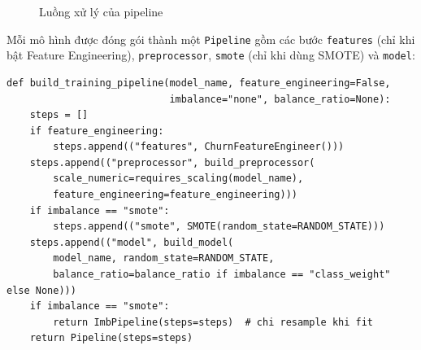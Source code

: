 \begin{figure}[H]
\centering
{}
\caption{Luồng xử lý của pipeline}
\end{figure}

Mỗi mô hình được đóng gói thành một \texttt{Pipeline} gồm các bước \texttt{features} (chỉ khi bật Feature Engineering), \texttt{preprocessor}, \texttt{smote} (chỉ khi dùng SMOTE) và \texttt{model}:

\begin{lstlisting}[style=pythonstyle, caption={Xây dựng pipeline huấn luyện trong \texttt{src/train.py} (rút gọn)}]
def build_training_pipeline(model_name, feature_engineering=False,
                            imbalance="none", balance_ratio=None):
    steps = []
    if feature_engineering:
        steps.append(("features", ChurnFeatureEngineer()))
    steps.append(("preprocessor", build_preprocessor(
        scale_numeric=requires_scaling(model_name),
        feature_engineering=feature_engineering)))
    if imbalance == "smote":
        steps.append(("smote", SMOTE(random_state=RANDOM_STATE)))
    steps.append(("model", build_model(
        model_name, random_state=RANDOM_STATE,
        balance_ratio=balance_ratio if imbalance == "class_weight" else None)))
    if imbalance == "smote":
        return ImbPipeline(steps=steps)  # chi resample khi fit
    return Pipeline(steps=steps)
\end{lstlisting}

